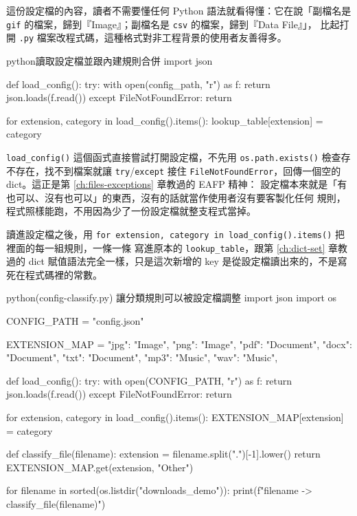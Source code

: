 這份設定檔的內容，讀者不需要懂任何 Python 語法就看得懂：它在說「副檔名是
\texttt{gif} 的檔案，歸到『Image』；副檔名是 \texttt{csv} 的檔案，歸到『Data File』」，
比起打開 \texttt{.py} 檔案改程式碼，這種格式對非工程背景的使用者友善得多。

\begin{code}{python}{讀取設定檔並跟內建規則合併}
import json

def load_config():
    try:
        with open(config_path, "r") as f:
            return json.loads(f.read())
    except FileNotFoundError:
        return {}


for extension, category in load_config().items():
    lookup_table[extension] = category
\end{code}

\texttt{load\_config()} 這個函式直接嘗試打開設定檔，不先用 \texttt{os.path.exists()}
檢查存不存在，找不到檔案就讓 \texttt{try}/\texttt{except} 接住
\texttt{FileNotFoundError}，回傳一個空的 dict。這正是第 \ref{ch:files-exceptions} 章教過的 EAFP 精神：
設定檔本來就是「有也可以、沒有也可以」的東西，沒有的話就當作使用者沒有要客製化任何
規則，程式照樣能跑，不用因為少了一份設定檔就整支程式當掉。

讀進設定檔之後，用
\texttt{for extension, category in load\_config().items()} 把裡面的每一組規則，一條一條
寫進原本的 \texttt{lookup\_table}，跟第 \ref{ch:dict-set} 章教過的 dict 賦值語法完全一樣，只是這次新增的
key 是從設定檔讀出來的，不是寫死在程式碼裡的常數。

\begin{example}{python}{(config-classify.py) 讓分類規則可以被設定檔調整}
import json
import os

CONFIG_PATH = "config.json"

EXTENSION_MAP = {
    "jpg": "Image", "png": "Image",
    "pdf": "Document", "docx": "Document", "txt": "Document",
    "mp3": "Music", "wav": "Music",
}


def load_config():
    try:
        with open(CONFIG_PATH, "r") as f:
            return json.loads(f.read())
    except FileNotFoundError:
        return {}


for extension, category in load_config().items():
    EXTENSION_MAP[extension] = category


def classify_file(filename):
    extension = filename.split(".")[-1].lower()
    return EXTENSION_MAP.get(extension, "Other")


for filename in sorted(os.listdir("downloads_demo")):
    print(f"{filename} -> {classify_file(filename)}")
\end{example}

